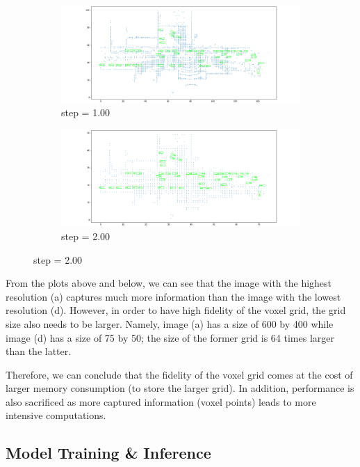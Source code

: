 \documentclass[letter]{article}
\begin{document}
	\begin{figure}[h]
		\begin{subfigure}[t]{\textwidth}
			\centering
			\includegraphics[width=\linewidth]{images/vox000_step1-00.png}
			\caption{step = 1.00}
		\end{subfigure}
		\vspace*{1mm}
	  
		\begin{subfigure}[t]{\textwidth}
			\centering
			\includegraphics[width=\linewidth]{images/vox000_step2-00.png}
			\caption{step = 2.00}
		\end{subfigure}
	\end{figure}

	From the plots above and below, we can see that the image with the highest resolution (a) captures much more information than the image with the lowest resolution (d). However, in order to have high fidelity of the voxel grid, the grid size also needs to be larger. Namely, image (a) has a size of 600 by 400 while image (d) has a size of 75 by 50; the size of the former grid is 64 times larger than the latter. 

	Therefore, we can conclude that the fidelity of the voxel grid comes at the cost of larger memory consumption (to store the larger grid). In addition, performance is also sacrificed as more captured information (voxel points) leads to more intensive computations. 

	\subsection{Model Training \& Inference}
\end{document}
